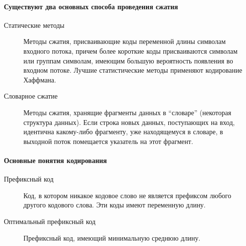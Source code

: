 \paragraph{Существуют два основных способа проведения сжатия}\label{par:compression-approaches}

\begin{description}
    \item [Статические методы]
          Методы сжатия, присваивающие коды переменной длины символам входного потока, причем более короткие коды присваиваются символам или группам символам, имеющим большую вероятность появления во входном потоке.
          Лучшие статистические методы применяют кодирование Хаффмана.
    \item [Словарное сжатие]
          Методы сжатия, хранящие фрагменты данных в \enquote{словаре} (некоторая структура данных).
          Если строка новых данных, поступающих на вход, идентична какому-либо фрагменту, уже находящемуся в словаре, в выходной поток помещается указатель на этот фрагмент.
\end{description}

\paragraph{Основные понятия кодирования}\label{par:compression-basic-concepts}

\begin{description}
    \item [Префиксный код]
          Код, в котором никакое кодовое слово не является префиксом любого другого кодового слова. Эти коды имеют переменную длину.
    \item [Оптимальный префиксный код]
          Префиксный код, имеющий минимальную среднюю длину.
\end{description}
